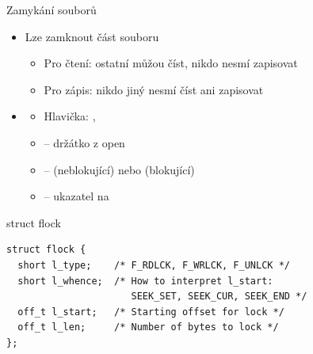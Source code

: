 \begin{frame}[fragile]{Zamykání souborů}

  \begin{itemize}
    \item Lze zamknout část souboru
    \begin{itemize}
      \item Pro čtení: ostatní můžou číst, nikdo nesmí zapisovat
      \item Pro zápis: nikdo jiný nesmí číst ani zapisovat
    \end{itemize}

    \pause

    \item {}
    \begin{itemize}
      \item Hlavička: , 
      \item {} -- držátko z open
      \item {} --  (neblokující) nebo 
        (blokující)
      \item {} -- ukazatel na 
    \end{itemize}
  \end{itemize}

  \begin{block}{struct flock}
  \begin{lstlisting}
struct flock {
  short l_type;    /* F_RDLCK, F_WRLCK, F_UNLCK */
  short l_whence;  /* How to interpret l_start:
                      SEEK_SET, SEEK_CUR, SEEK_END */
  off_t l_start;   /* Starting offset for lock */
  off_t l_len;     /* Number of bytes to lock */
};
  \end{lstlisting}
  \end{block}

\end{frame}

